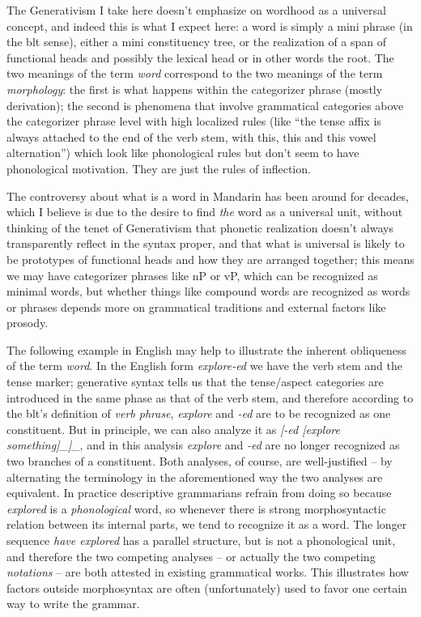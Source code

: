 \documentclass[UTF8, a4paper, oneside, scheme=plain, 12pt]{ctexrep}
\newcommand*{\term}[1]{\emph{#1}}
\newcommand{\form}[1]{\emph{#1}}
\begin{document}
{The Generativism I take here doesn't emphasize on wordhood as a universal concept,
and indeed this is what I expect here:
a word is simply a mini phrase (in the \acs{blt} sense),
either a mini constituency tree,
or the realization of a span of functional heads 
and possibly the lexical head or in other words the root.
The two meanings of the term \term{word} 
correspond to the two meanings of
the term \term{morphology}:
the first is what happens within the categorizer phrase
(mostly derivation);
the second is phenomena that involve grammatical categories 
above the categorizer phrase level 
with high localized rules 
(like ``the tense affix is always attached to the end of the verb stem, 
with this, this and this vowel alternation'') 
which look like phonological rules but don't seem to have phonological motivation. 
They are just the rules of inflection. 


The controversy about what is a word in Mandarin 
has been around for decades,
which I believe is due to the desire to 
find \emph{the} word as a universal unit,
without thinking of the tenet of Generativism 
that phonetic realization doesn't always 
transparently reflect in the syntax proper,
and that what is universal is likely to be 
prototypes of functional heads and how they are arranged together;
this means we may have categorizer phrases like nP or vP,
which can be recognized as minimal words,
but whether things like compound words are recognized as words or phrases 
depends more on grammatical traditions
and external factors like prosody.

The following example in English may help to illustrate the 
inherent obliqueness of the term \term{word}.
In the English form \form{explore-ed} 
we have the verb stem and the tense marker;  
generative syntax tells us that the tense/aspect categories are 
introduced in the same phase as that of the verb stem, 
and therefore according to the \ac{blt}'s definition of 
\term{verb phrase}, 
\form{explore} and \form{-ed} are to be recognized as 
one constituent.
But in principle, we can also analyze it as 
\form{[-ed [explore \emph{something}]_{}]_{\text{\acs{tame} marking}}},
and in this analysis 
\form{explore} and \form{-ed} are no longer recognized as 
two branches of a constituent. 
Both analyses, of course, are well-justified -- 
by alternating the terminology in the aforementioned way 
the two analyses are equivalent.
In practice descriptive grammarians refrain from doing so 
because \form{explored} is a \emph{phonological} word, 
so whenever there is strong morphosyntactic relation 
between its internal parts, 
we tend to recognize it as a word. 
The longer sequence \form{have explored} 
has a parallel structure, 
but is not a phonological unit, 
and therefore the two competing analyses -- or actually the two competing \emph{notations} -- 
are both attested in existing grammatical works.
This illustrates how factors outside morphosyntax 
are often (unfortunately) used to favor one certain way to write the grammar. 

}
\end{document}
